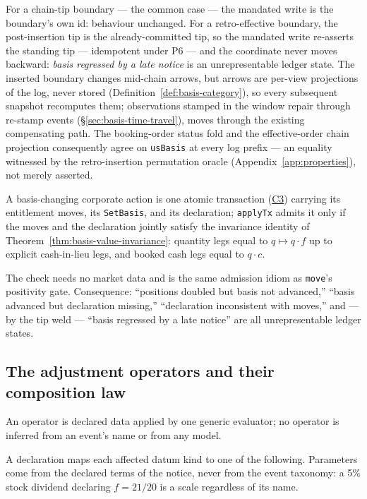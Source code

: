 For a chain-tip boundary --- the common case --- the mandated write is the boundary's own
id: behaviour unchanged. For a retro-effective boundary, the post-insertion tip is the
already-committed tip, so the mandated write re-asserts the standing tip --- idempotent
under P6 --- and the coordinate never moves backward: \emph{basis regressed by a late
notice} is an unrepresentable ledger state. The inserted boundary changes mid-chain
arrows, but arrows are per-view projections of the log, never stored
(Definition~\ref{def:basis-category}), so every subsequent snapshot recomputes them;
observations stamped in the window repair through re-stamp events
(\S\ref{sec:basis-time-travel}), moves through the existing compensating path. The
booking-order status fold and the effective-order chain projection consequently agree on
\texttt{usBasis} at every log prefix --- an equality witnessed by the retro-insertion
permutation oracle (Appendix~\ref{app:properties}), not merely asserted.

\begin{principle}
\label{prin:invariance-weld}
A basis-changing corporate action is one atomic transaction
(\hyperref[cond:C3]{C3}) carrying its entitlement moves, its \texttt{SetBasis}, and its
declaration; \texttt{applyTx} admits it only if the moves and the declaration jointly
satisfy the invariance identity of Theorem~\ref{thm:basis-value-invariance}: quantity
legs equal to $q\mapsto q\cdot f$ up to explicit cash-in-lieu legs, and booked cash legs
equal to $q\cdot c$.
\end{principle}

The check needs no market data and is the same admission idiom as \texttt{move}'s
positivity gate. Consequence: ``positions doubled but basis not advanced,'' ``basis
advanced but declaration missing,'' ``declaration inconsistent with moves,'' and --- by
the tip weld --- ``basis regressed by a late notice'' are all unrepresentable ledger
states.

\subsection{The adjustment operators and their composition law}
\label{sec:basis-operators}

An operator is declared data applied by one generic evaluator; no operator is inferred
from an event's name or from any model.

\begin{definition}
\label{def:opspec}
A declaration maps each affected datum kind to one of the following. Parameters come
from the declared terms of the notice, never from the event taxonomy: a 5\% stock
dividend declaring $f=21/20$ is a scale regardless of its name.
\end{definition}

